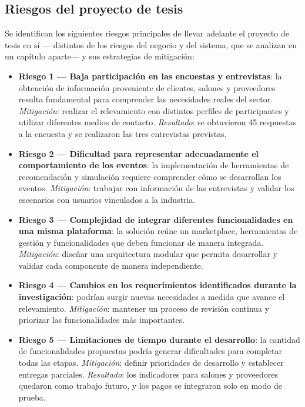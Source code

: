 \subsection{Riesgos del proyecto de tesis}

Se identifican los siguientes riesgos principales de llevar adelante el
proyecto de tesis en sí --- distintos de los riesgos del negocio y del
sistema, que se analizan en un capítulo aparte--- y sus estrategias de
mitigación:

\begin{itemize}
    \item \textbf{Riesgo 1 — Baja participación en las encuestas y
          entrevistas}: la obtención de información proveniente de
          clientes, salones y proveedores resulta fundamental para
          comprender las necesidades reales del sector.
          \emph{Mitigación}: realizar el relevamiento con distintos
          perfiles de participantes y utilizar diferentes medios de
          contacto. \emph{Resultado}: se obtuvieron 45 respuestas a la
          encuesta y se realizaron las tres entrevistas
          previstas.
    \item \textbf{Riesgo 2 — Dificultad para representar adecuadamente el
          comportamiento de los eventos}: la implementación de
          herramientas de recomendación y simulación requiere comprender
          cómo se desarrollan los eventos. \emph{Mitigación}: trabajar con
          información de las entrevistas y validar los escenarios con
          usuarios vinculados a la industria.
    \item \textbf{Riesgo 3 — Complejidad de integrar diferentes
          funcionalidades en una misma plataforma}: la solución reúne un
          marketplace, herramientas de gestión y funcionalidades que deben funcionar de manera integrada.
          \emph{Mitigación}: diseñar una arquitectura modular que permita
          desarrollar y validar cada componente de manera independiente.
    \item \textbf{Riesgo 4 — Cambios en los requerimientos identificados
          durante la investigación}: podrían surgir nuevas necesidades a
          medida que avance el relevamiento. \emph{Mitigación}: mantener
          un proceso de revisión continua y priorizar las funcionalidades
          más importantes.
    \item \textbf{Riesgo 5 — Limitaciones de tiempo durante el
          desarrollo}: la cantidad de funcionalidades propuestas podría
          generar dificultades para completar todas las etapas.
          \emph{Mitigación}: definir prioridades de desarrollo y
          establecer entregas parciales. \emph{Resultado}: los
          indicadores para salones y proveedores quedaron como trabajo
          futuro, y los pagos se integraron solo en modo de prueba.
\end{itemize}

